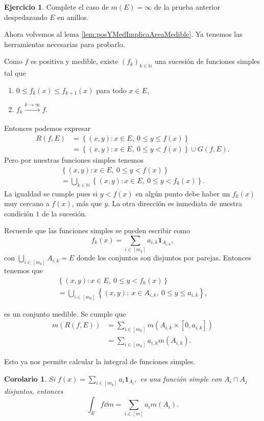 \documentclass[12pt]{article}
\theoremstyle{plain}
\newtheorem{Cor}[Th]{Corolario}        %
\theoremstyle{definition}
\newtheorem{Ej}[Th]{Ejercicio}
\theoremstyle{remark}
\numberwithin{equation}{section}
\newcommand{\bN}{\mathbb{N}}        %
\newcommand{\ind}{\mathbf{1}}       %
\renewcommand{\leq}{\leqslant}      %
\renewcommand{\:}{\colon}           %
\newcommand{\conj}[1]{\left\lbrace#1\right\rbrace}
\newcommand{\bonj}[1]{\left\lbrack#1\right\rbrack}
\begin{document}
\begin{multicols}{2}
\begin{Ej}
  Complete el caso de $m(E)=\infty$ de la prueba anterior despedazando $E$ en anillos.
\end{Ej}

Ahora volvemos al lema \ref{lem:posYMedImplicaAreaMedible}. Ya tenemos las herramientas necesarias para probarlo.

\begin{ptcbp}
Como $f$ es positiva y medible, existe $(f_k)_{k\in\bN}$ una sucesión de funciones simples tal que
\begin{enumerate}
  \item $0\leq f_k(x)\leq f_{k+1}(x)$ para todo $x\in E$,
  \item $f_k\xrightarrow[]{k\to\infty}f$.
\end{enumerate}
Entonces podemos expresar
\begin{align*}
  R(f,E) &=\conj{(x,y)\: x\in E,\ 0\leq y\leq f(x)}\\
  &=\conj{(x,y)\: x\in E,\ 0\leq y< f(x)}\cup G(f,E).
\end{align*}
Pero por nuestras funciones simples tenemos
\begin{gather*}
\conj{(x,y)\: x\in E,\ 0\leq y< f(x)}\\
=\bigcup_{k\in\bN}\conj{(x,y)\: x\in E,\ 0\leq y< f_k(x)}.
\end{gather*}
La igualdad se cumple pues si $y<f(x)$ en algún punto debe haber un $f_k(x)$ muy cercano a $f(x)$, más que $y$. La otra dirección es inmediata de nuestra condición $\mathit{1}$ de la sucesión.\par
Recuerde que las funciones simples se pueden escribir como
$$f_k(x)=\sum_{i\in\bonj{m_k}}a_{i,k}\ind_{A_{i,k}},$$
con $\bigcup_{i\in\bonj{m_k}}A_{i,k}= E$ donde los conjuntos son disjuntos por parejas. Entonces tenemos que
\begin{gather*}
  \conj{(x,y)\: x\in E,\ 0\leq y< f_k(x)}\\
  =\bigcup_{i\in\bonj{m_k}}\conj{(x,y)\:\ x\in A_{i,k},\ 0\leq y\leq a_{i,k}},
\end{gather*}

es un conjunto medible. Se cumple que
\begin{align*}
  m(R(f,E)) &=\sum_{i\in\bonj{m_k}}m(A_{i,k}\times\bonj{0,a_{i,k}})\\
  &=\sum_{i\in\bonj{m_k}}a_{i,k}m(A_{i,k}).
\end{align*}
\end{ptcbp}

Esto ya nos permite calcular la integral de funciones simples.
\begin{Cor}
  Si $f(x)=\sum_{i\in\bonj{m_k}}a_i\ind_{A_i},$
  es una función simple con $A_i\cap A_j$ disjuntos, entonces
  $$\int_{E}f\dd m=\sum_{i\in\bonj{m}}a_im(A_i).$$
\end{Cor}


\end{multicols}
\end{document}
